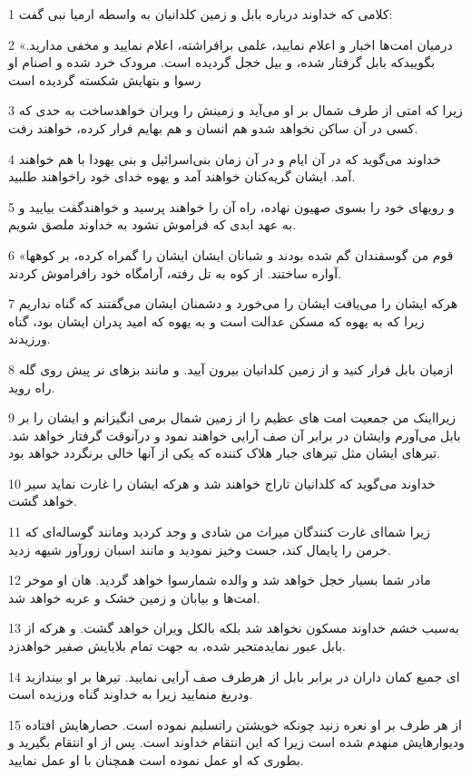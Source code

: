 \par 1 کلامی که خداوند درباره بابل و زمین کلدانیان به واسطه ارمیا نبی گفت:
\par 2 «درمیان امت‌ها اخبار و اعلام نمایید، علمی برافراشته، اعلام نمایید و مخفی مدارید. بگوییدکه بابل گرفتار شده، و بیل خجل گردیده است. مرودک خرد شده و اصنام او رسوا و بتهایش شکسته گردیده است
\par 3 زیرا که امتی از طرف شمال بر او می‌آید و زمینش را ویران خواهدساخت به حدی که کسی در آن ساکن نخواهد شدو هم انسان و هم بهایم فرار کرده، خواهند رفت.
\par 4 خداوند می‌گوید که در آن ایام و در آن زمان بنی‌اسرائیل و بنی یهودا با هم خواهند آمد. ایشان گریه‌کنان خواهند آمد و یهوه خدای خود راخواهند طلبید.
\par 5 و رویهای خود را بسوی صهیون نهاده، راه آن را خواهند پرسید و خواهندگفت بیایید و به عهد ابدی که فراموش نشود به خداوند ملصق شویم.
\par 6 «قوم من گوسفندان گم شده بودند و شبانان ایشان ایشان را گمراه کرده، بر کوهها آواره ساختند. از کوه به تل رفته، آرامگاه خود رافراموش کردند.
\par 7 هر‌که ایشان را می‌یافت ایشان را می‌خورد و دشمنان ایشان می‌گفتند که گناه نداریم زیرا که به یهوه که مسکن عدالت است و به یهوه که امید پدران ایشان بود، گناه ورزیدند.
\par 8 ازمیان بابل فرار کنید و از زمین کلدانیان بیرون آیید. و مانند بزهای نر پیش روی گله راه روید.
\par 9 زیرااینک من جمعیت امت های عظیم را از زمین شمال برمی انگیزانم و ایشان را بر بابل می‌آورم وایشان در برابر آن صف آرایی خواهند نمود و درآنوقت گرفتار خواهد شد. تیرهای ایشان مثل تیرهای جبار هلاک کننده که یکی از آنها خالی برنگردد خواهد بود.
\par 10 خداوند می‌گوید که کلدانیان تاراج خواهند شد و هر‌که ایشان را غارت نماید سیر خواهد گشت.
\par 11 زیرا شما‌ای غارت کنندگان میراث من شادی و وجد کردید ومانند گوساله‌ای که خرمن را پایمال کند، جست وخیز نمودید و مانند اسبان زورآور شیهه زدید.
\par 12 مادر شما بسیار خجل خواهد شد و والده شمارسوا خواهد گردید. هان او موخر امت‌ها و بیابان و زمین خشک و عربه خواهد شد.
\par 13 به‌سبب خشم خداوند مسکون نخواهد شد بلکه بالکل ویران خواهد گشت. و هر‌که از بابل عبور نمایدمتحیر شده، به جهت تمام بلایایش صفیر خواهدزد.
\par 14 ‌ای جمیع کمان داران در برابر بابل از هرطرف صف آرایی نمایید. تیرها بر او بیندازید ودریغ منمایید زیرا به خداوند گناه ورزیده است.
\par 15 از هر طرف بر او نعره زنید چونکه خویشتن راتسلیم نموده است. حصارهایش افتاده ودیوارهایش منهدم شده است زیرا که این انتقام خداوند است. پس از او انتقام بگیرید و بطوری که او عمل نموده است همچنان با او عمل نمایید.
